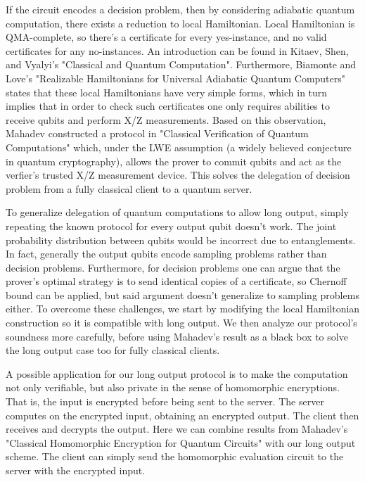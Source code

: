 If the circuit encodes a decision problem, then by considering adiabatic quantum computation, there exists a reduction to local Hamiltonian. Local Hamiltonian is QMA-complete, so there's a certificate for every yes-instance, and no valid certificates for any no-instances. An introduction can be found in Kitaev, Shen, and Vyalyi's "Classical and Quantum Computation". Furthermore, Biamonte and Love's "Realizable Hamiltonians for Universal Adiabatic Quantum Computers" states that these local Hamiltonians have very simple forms, which in turn implies that in order to check such certificates one only requires abilities to receive qubits and perform X/Z measurements. Based on this observation, Mahadev constructed a protocol in "Classical Verification of Quantum Computations" which, under the LWE assumption (a widely believed conjecture in quantum cryptography), allows the prover to commit qubits and act as the verfier's trusted X/Z measurement device. This solves the delegation of decision problem from a fully classical client to a quantum server.

To generalize delegation of quantum computations to allow long output, simply repeating the known protocol for every output qubit doesn't work. The joint probability distribution between qubits would be incorrect due to entanglements. In fact, generally the output qubits encode sampling problems rather than decision problems. Furthermore, for decision problems one can argue that the prover's optimal strategy is to send identical copies of a certificate, so Chernoff bound can be applied, but said argument doesn't generalize to sampling problems either. To overcome these challenges, we start by modifying the local Hamiltonian construction so it is compatible with long output. We then analyze our protocol's soundness more carefully, before using Mahadev's result as a black box to solve the long output case too for fully classical clients.

A possible application for our long output protocol is to make the computation not only verifiable, but also private in the sense of homomorphic encryptions. That is, the input is encrypted before being sent to the server. The server computes on the encrypted input, obtaining an encrypted output. The client then receives and decrypts the output. Here we can combine results from Mahadev's "Classical Homomorphic Encryption for Quantum Circuits" with our long output scheme. The client can simply send the homomorphic evaluation circuit to the server with the encrypted input.
